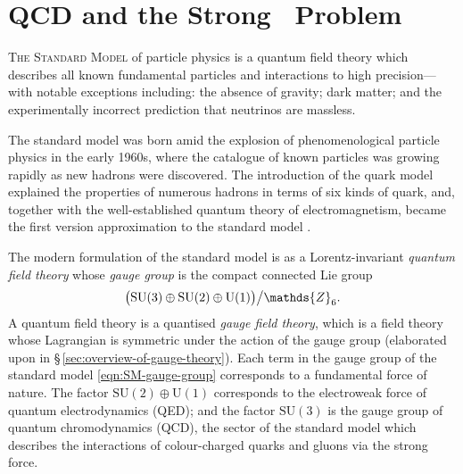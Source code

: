 \chapter{QCD and the Strong \CP\ Problem}

\textsc{The Standard Model} of particle physics is a quantum field theory which describes all known fundamental particles and interactions to high precision---with notable exceptions including:
the absence of gravity;
dark matter;
and the experimentally incorrect prediction that neutrinos are massless.

The standard model was born amid the explosion of phenomenological particle physics in the early 1960s, where the catalogue of known particles was growing rapidly as new hadrons were discovered.
The introduction of the quark model explained the properties of numerous hadrons in terms of six kinds of quark, and, together with the well-established quantum theory of electromagnetism, became the first version approximation to the standard model \cite{Weinberg_2004-history}.

The modern formulation of the standard model is as a Lorentz-invariant \emph{quantum field theory} whose \emph{gauge group} is the compact connected Lie group
\begin{align}
	\qty\big(\mathrm{SU}(3)\oplus\mathrm{SU}(2)\oplus\mathrm{U}(1))\big/\mathds{Z}_6
	\label{eqn:SM-gauge-group}
.\end{align}
A quantum field theory is a quantised \emph{gauge field theory}, which is a field theory whose Lagrangian is symmetric under the action of the gauge group (elaborated upon in §\,\ref{sec:overview-of-gauge-theory}).
Each term in the gauge group of the standard model \eqref{eqn:SM-gauge-group} corresponds to a fundamental force of nature.
The factor $\mathrm{SU}(2)\oplus\mathrm{U}(1)$ corresponds to the electroweak force of quantum electrodynamics (QED); and the factor $\mathrm{SU}(3)$ is the gauge group of quantum chromodynamics (QCD), the sector of the standard model which describes the interactions of colour-charged quarks and gluons via the strong force.

